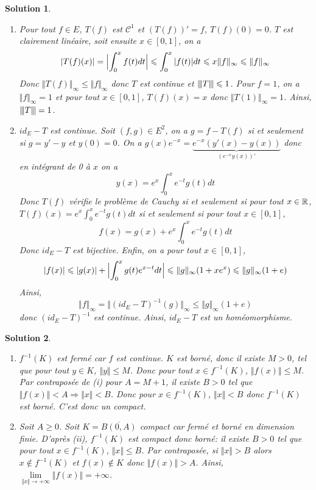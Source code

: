 \documentclass[12pt]{article}
\newtheorem{solution}{Solution}[section]
\theoremstyle{remark}
\newcommand{\vertiii}[1]{{\left\vert\kern-0.25ex\left\vert\kern-0.25ex\left\vert{}#1
\right\vert\kern-0.25ex\right\vert\kern-0.25ex\right\vert}}
\begin{document}
\begin{solution}
	\phantom{}
	\begin{enumerate}
		\item Pour tout $f\in E$, $T(f)$ est $\mathcal{C}^{1}$ et $(T(f))'=f$, $T(f)(0)=0$. $T$ est clairement linéaire, soit ensuite $x\in[0,1]$, on a 
		$$\vert T(f)(x)\vert=\Bigl\lvert\int_{0}^{x}f(t)dt\Bigr\rvert\leqslant\int_{0}^{x}\vert f(t)\vert dt\leqslant x\Vert f\Vert_{\infty}\leqslant\Vert f\Vert_{\infty}$$
		Donc $\Vert T(f)\Vert_{\infty}\leqslant\Vert f\Vert_{\infty}$ donc $T$ est continue et $\vertiii{T}\leqslant1$. Pour $f=1$, on a $\Vert f\Vert_{\infty}=1$ et pour tout $x\in[0,1]$, $T(f)(x)=x$ donc $\Vert T(1)\Vert_{\infty}=1$. Ainsi, $\vertiii{T}=1$.

		\item $id_{E}-T$ est continue. Soit $(f,g)\in E^{2}$, on a $g=f-T(f)$ si et seulement si $g=y'-y$ et $y(0)=0$. 
		On a $g(x)e^{-x}=\underbrace{e^{-x}(y'(x)-y(x))}_{(e^{-x}y(x))'}$ donc en intégrant de 0 à $x$ on a 
		$$y(x)=e^{x}\int_{0}^{x}e^{-t}g(t)dt$$
		Donc $T(f)$ vérifie le problème de Cauchy si et seulement si pour tout $x\in\mathbb{R}$, $T(f)(x)=e^{x}\int_{0}^{x}e^{-t}g(t)dt$ si et seulement si pour tout $x\in[0,1]$, 
		$$f(x)=g(x)+e^{x}\int_{0}^{x}e^{-t}g(t)dt$$
		Donc $id_{E}-T$ est bijective. 
		Enfin, on a pour tout $x\in[0,1]$, 
		$$\vert f(x)\vert\leqslant\vert g(x)\vert+\Bigl\lvert\int_{0}^{x}g(t)e^{x-t}dt\Bigr\rvert\leqslant\Vert g\Vert_{\infty}(1+xe^{x})\leqslant\Vert g\Vert_{\infty}(1+e)$$
		Ainsi, 
		$$\Vert f\Vert_{\infty}=\Vert(id_{E}-T)^{-1}(g)\Vert_{\infty}\leqslant\Vert g\Vert_{\infty}(1+e)$$
		donc $(id_{E}-T)^{-1}$ est continue. Ainsi, $id_{E}-T$ est un homéomorphisme.
	\end{enumerate}
\end{solution}

\begin{solution}
	\phantom{}
	\begin{enumerate}
		\item [(i) $\Rightarrow$ (ii)] $f^{-1}(K)$ est fermé car $f$ est continue. $K$ est borné, donc il existe $M>0$, tel que pour tout $y\in K$, $\Vert y\Vert\leqslant M$. Donc pour tout $x\in f^{-1}(K)$, $\Vert f(x)\Vert\leqslant M$. Par contraposée de (i) pour $A=M+1$, il existe $B>0$ tel que $\Vert f(x)\Vert<A\Rightarrow\Vert x\Vert<B$. Donc pour $x\in f^{-1}(K)$, $\Vert x\Vert<B$ donc $f^{-1}(K)$ est borné. C'est donc un compact.
		\item [(ii) $\Rightarrow$ (i)] Soit $A\geqslant0$. Soit $K=\overline{B(0,A)}$ compact car fermé et borné en dimension finie. D'après (ii), $f^{-1}(K)$ est compact donc borné: il existe $B>0$ tel que pour tout $x\in f^{-1}(K)$, $\Vert x\Vert\leqslant B$. Par contraposée, si $\Vert x\Vert>B$ alors $x\notin f^{-1}(K)$ et $f(x)\notin K$ donc $\Vert f(x)\Vert >A$. Ainsi, $\lim\limits_{\Vert x\Vert\to+\infty}\Vert f(x)\Vert=+\infty$.
	\end{enumerate}
\end{solution}
\end{document}

